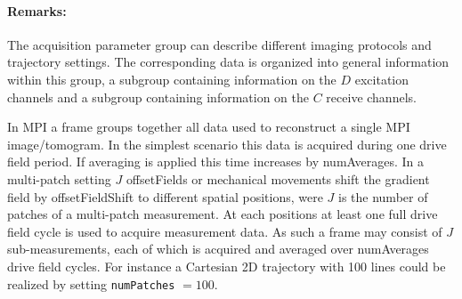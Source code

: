 \documentclass[landscape,a4paper]{article} %
\newcommand{\inl}[1]{\lstinline[columns=fixed]{#1}}
\newcommand{\inlvar}[1]{{\ttfamily#1}}
\begin{document}
\begin{multicols}{2}
\paragraph{Remarks:} The acquisition parameter group can describe different imaging protocols and trajectory settings. The corresponding data is organized into general information within this group, a subgroup containing information on the $D$ excitation channels and a subgroup containing information on the $C$ receive channels.

In MPI a frame groups together all data used to reconstruct a single MPI image/tomogram. In the simplest scenario this data is acquired during one drive field period. If averaging is applied this time increases by \inlvar{numAverages}. In a multi-patch setting $J$ \inlvar{offsetField}s or mechanical movements shift the gradient field by \inlvar{offsetFieldShift} to different spatial positions, were $J$ is the number of patches of a multi-patch measurement. At each positions at least one full drive field cycle is used to acquire measurement data. As such a frame may consist of $J$ sub-measurements, each of which is acquired and averaged over \inlvar{numAverages} drive field cycles. For instance a Cartesian 2D trajectory with 100 lines could be realized by setting \inl{numPatches} $ = 100$.
\end{multicols}
\end{document}
